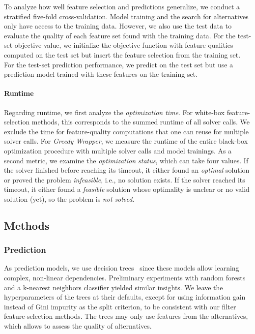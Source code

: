 \documentclass[iicol, sn-basic, Numbered]{sn-jnl} %
\theoremstyle{plain}
\theoremstyle{definition}
\begin{document}
To analyze how well feature selection and predictions generalize, we conduct a stratified five-fold cross-validation.
Model training and the search for alternatives only have access to the training data.
However, we also use the test data to evaluate the quality of each feature set found with the training data.
For the test-set objective value, we initialize the objective function with feature qualities computed on the test set but insert the feature selection from the training set.
For the test-set prediction performance, we predict on the test set but use a prediction model trained with these features on the training set.

\paragraph{Runtime}

Regarding runtime, we first analyze the \emph{optimization time}.
For white-box feature-selection methods, this corresponds to the summed runtime of all solver calls.
We exclude the time for feature-quality computations that one can reuse for multiple solver calls.
For \emph{Greedy Wrapper}, we measure the runtime of the entire black-box optimization procedure with multiple solver calls and model trainings.
As a second metric, we examine the \emph{optimization status}, which can take four values.
If the solver finished before reaching its timeout, it either found an \emph{optimal} solution or proved the problem \emph{infeasible}, i.e., no solution exists.
If the solver reached its timeout, it either found a \emph{feasible} solution whose optimality is unclear or no valid solution (yet), so the problem is \emph{not solved}.

\subsection{Methods}
\label{sec:afs:experimental-design:approaches}

\subsubsection{Prediction}
\label{sec:afs:experimental-design:approaches:prediction}

As prediction models, we use decision trees~\cite{breiman1984classification} since these models allow learning complex, non-linear dependencies.
Preliminary experiments with random forests~\cite{breiman2001random} and a k-nearest neighbors classifier yielded similar insights.
We leave the hyperparameters of the trees at their defaults, except for using information gain instead of Gini impurity as the split criterion, to be consistent with our filter feature-selection methods. 
The trees may only use features from the alternatives, which allows to assess the quality of alternatives.
\end{document}
